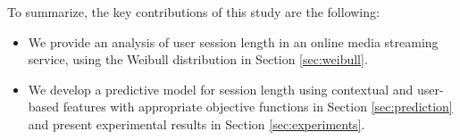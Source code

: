 To summarize, the key contributions of this study are the following:

\begin{itemize}
    \item We provide an analysis of user session length in an online media streaming service, using the Weibull distribution in Section \ref{sec:weibull}.
    \item We develop a predictive model for session length using contextual and user-based features
    with appropriate objective functions in Section \ref{sec:prediction} and present experimental
    results in Section \ref{sec:experiments}.
\end{itemize}
